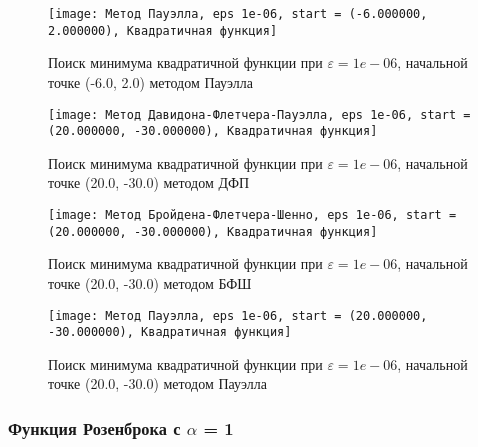             \begin{figure}[H]
	        \centering
	        \texttt{[image: Метод Пауэлла, eps 1e-06, start = (-6.000000, 2.000000), Квадратичная функция]}%
	        \caption{Поиск минимума квадратичной функции при $\varepsilon = 1e-06$, начальной точке (-6.0, 2.0) методом Пауэлла}
	        \vspace*{-1.2cm}
            \end{figure}
            
            \begin{figure}[H]
	        \centering
	        \texttt{[image: Метод Давидона-Флетчера-Пауэлла, eps 1e-06, start = (20.000000, -30.000000), Квадратичная функция]}%
	        \caption{Поиск минимума квадратичной функции при $\varepsilon = 1e-06$, начальной точке (20.0, -30.0) методом ДФП}
	        \vspace*{-1.2cm}
            \end{figure}
            
            \begin{figure}[H]
	        \centering
	        \texttt{[image: Метод Бройдена-Флетчера-Шенно, eps 1e-06, start = (20.000000, -30.000000), Квадратичная функция]}%
	        \caption{Поиск минимума квадратичной функции при $\varepsilon = 1e-06$, начальной точке (20.0, -30.0) методом БФШ}
	        \vspace*{-1.2cm}
            \end{figure}
            
            \begin{figure}[H]
	        \centering
	        \texttt{[image: Метод Пауэлла, eps 1e-06, start = (20.000000, -30.000000), Квадратичная функция]}%
	        \caption{Поиск минимума квадратичной функции при $\varepsilon = 1e-06$, начальной точке (20.0, -30.0) методом Пауэлла}
	        \vspace*{-1.2cm}
            \end{figure}
            \subsubsection{Функция Розенброка с $\alpha$ = 1}

